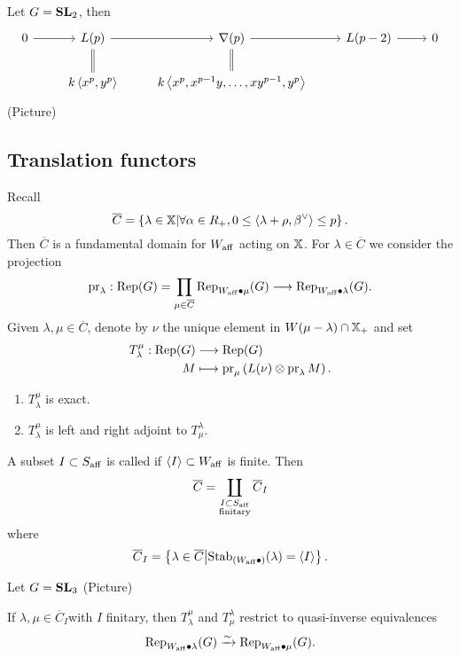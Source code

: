 		\begin{example}
			Let $G=\mathbf{SL}_2$, then
			\[
				\begin{tikzcd}
					0 \ar[r] & L(p) \ar[r] \ar[d,equals] & \nabla(p) \ar[r] \ar[d,equals] & L(p-2) \ar[r] & 0 \\
					& k\left<x^{p},y^{p} \right> & k\left<x^{p},x^{p-1}y,\dots,xy^{p-1},y^{p} \right>
				\end{tikzcd}
			\]
			(Picture)
		\end{example}
		\subsection{Translation functors}
		Recall
		\[
			\overline{C} = \left\{ \lambda\in \mathbb{X} \middle| \forall \alpha\in R_+,0\le
			\left<\lambda+\rho,\beta^{\vee} \right>\le p \right\} .
		\]
		Then $\overline{C}$ is a fundamental domain for $W_{\mathrm{aff}}$ acting on $\mathbb{X}$. For
		$\lambda\in \overline{C}$ we consider the projection
		\[
			\pr_\lambda:\Rep(G) = \prod_{\mu\in \overline{C}}\Rep_{W\aff\bullet\mu}(G) \to
			\Rep_{W\aff\bullet\lambda}(G).
		\]
		Given $\lambda,\mu\in \overline{C}$, denote by $\nu$ the unique element in
		$W(\mu-\lambda)\cap \mathbb{X}_+$ and set
		\begin{align*}
			T_\lambda^{\mu}: \operatorname{Rep}(G) &\longrightarrow \operatorname{Rep}(G) \\
			M &\longmapsto \operatorname{pr}_\mu\left( L(\nu)\otimes\operatorname{pr}_\lambda M \right) .
		\end{align*}
		\begin{fact}\leavevmode
			\begin{enumerate}[(1)]
				\item $T_\lambda^{\mu}$ is exact.
				\item $T_\lambda^{\mu}$ is left and right adjoint to $T_\mu^{\lambda}$.
			\end{enumerate}
		\end{fact}
		A subset $I\subset S_{\mathrm{aff}}$ is called  if $\left<I \right>\subset W_{\mathrm{aff}}$
		is finite. Then
		\[
			\overline{C} = \coprod_{\substack{I\subset S_{\mathrm{aff}} \\ \text{finitary}}} \overline{C}_I
		\]
		where
		\[
			\overline{C}_I = \left\{ \lambda\in \overline{C} \middle|
			\operatorname{Stab}_{(W_{\mathrm{aff}}\bullet)}(\lambda)=\left<I \right> \right\} .
		\]
		\begin{example}
			Let $G=\mathbf{SL}_3$ (Picture)
		\end{example}
		\begin{theorem}
			If $\lambda,\mu\in \overline{C}_I$with $I$ finitary, then $T_\lambda^{\mu}$ and
			$T_\mu^{\lambda}$ restrict to quasi-inverse equivalences
			\[
				\operatorname{Rep}_{W_{\mathrm{aff}}\bullet\lambda}(G)\xrightarrow{\sim} \operatorname{Rep}_{W_{\mathrm{aff}}\bullet\mu}(G).
			\]
		\end{theorem}
